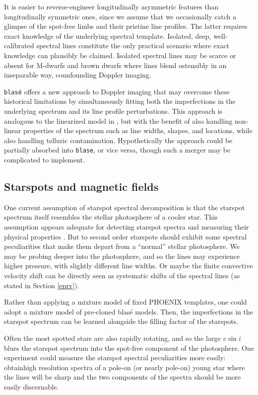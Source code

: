 \documentclass[twocolumn]{aastex631}
\begin{document}
It is easier to reverse-engineer longitudinally asymmetric features than longitudinally symmetric ones, since we assume that we occasionally catch a glimpse of the spot-free limbs and their pristine line profiles.
The latter requires exact knowledge of the underlying spectral template.  Isolated, deep, well-calibrated spectral lines constitute the only practical scenario where exact knowledge can plausibly be claimed.  Isolated spectral lines may be scarce or absent for M-dwarfs and brown dwarfs where lines blend ostensibly in an inseparable way, counfounding Doppler imaging.

\texttt{blas\'e} offers a new approach to Doppler imaging that may overcome these historical limitations by simultaneously fitting both the imperfections in the underlying spectrum and its line profile perturbations.  This approach is analogous to the linearized model in \citet{2021arXiv211006271L}, but with the benefit of also handling non-linear properties of the spectrum such as line widths, shapes, and locations, while also handling telluric contamination.  Hypothetically the \citet{2021arXiv211006271L} approach could be partially absorbed into \texttt{blase}, or vice versa, though such a merger may be complicated to implement.


\subsection{Starspots and magnetic fields}
One current assumption of starspot spectral decomposition is that the starspot spectrum itself resembles the stellar photosphere of a cooler star.  This assumption appears adequate for detecting starspot spectra and measuring their physical properties \citep{gullysantiago17}.  But to second order starspots should exhibit some spectral peculiarities that make them depart from a ``normal'' stellar photosphere.  We may be probing deeper into the photosphere, and so the lines may experience higher pressure, with slightly different line widths.  Or maybe the finite convective velocity shift can be directly seen as systematic shifts of the spectral lines (as stated in Section \ref{eprv}).

Rather than applying a mixture model of fixed PHOENIX templates, one could adopt a mixture model of pre-cloned blas\'e models.  Then, the imperfections in the starspot spectrum can be learned alongside the filling factor of the starspots.

Often the most spotted stars are also rapidly rotating, and so the large $v\sin{i}$ blurs the starspot spectrum into the spot-free component of the photosphere.  One experiment could measure the starspot spectral peculiarities more easily: obtainhigh resolution spectra of a pole-on (or nearly pole-on) young star where the lines will be sharp and the two components of the spectra should be more easily discernable.
\end{document}
